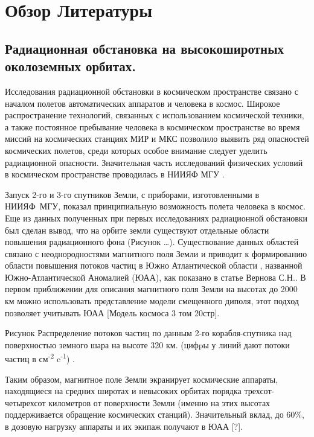 \chapter{Обзор Литературы} \label{chapt1}

\section{Радиационная обстановка на высокоширотных околоземных орбитах. } \label{sect1_1}

Исследования радиационной обстановки в космическом пространстве связано с началом полетов автоматических аппаратов и человека в космос.  Широкое распространение технологий, связанных с использованием космической техники, а также постоянное пребывание человека в космическом пространстве во время миссий на космических станциях МИР и МКС позволило выявить ряд опасностей космических полетов, среди которых особое внимание следует уделить радиационной опасности. Значительная часть исследований физических условий в космическом пространстве проводилась в НИИЯФ МГУ \cite{logachev2007}.


Запуск 2-го и 3-го спутников Земли, с приборами, изготовленными в НИИЯФ~МГУ,  
показал принципиальную возможность полета человека в космос.  Еще из данных полученных при первых исследованиях радиационной 
обстановки был сделан вывод, что на орбите земли существуют отдельные области повышения радиационного фона (Рисунок \ldots{}). Существование данных областей связано с неоднородностями 
магнитного поля Земли и приводит к формированию области повышения потоков 
частиц в 
Южно Атлантической области \cite{logachev2007}, названной Южно-Атлантической 
Аномалией (ЮАА), как показано в статье Вернова С.Н.\cite{vernov1961}. В первом 
приближении для описания магнитного поля  Земли на высотах до 2000 км можно 
использовать представление модели смещенного диполя, этот подход позволяет 
учитывать ЮАА [Модель космоса 3 том 20стр].

Рисунок Распределение потоков частиц по данным 2-го корабля-спутника над поверхностью земного шара на высоте 320 км. (цифpы у линий дают потоки частиц в см\textsuperscript{-2} c\textsuperscript{-1}) \cite{logachev2007}.


Таким образом, магнитное поле Земли экранирует космические аппараты, находящиеся на средних широтах и невысоких орбитах порядка трехсот-четырехсот километров от поверхности Земли (именно на этих высотах поддерживается обращение космических станций). Значительный вклад, до 60\%,  в дозовую нагрузку аппараты и их экипаж получают в ЮАА [?].


